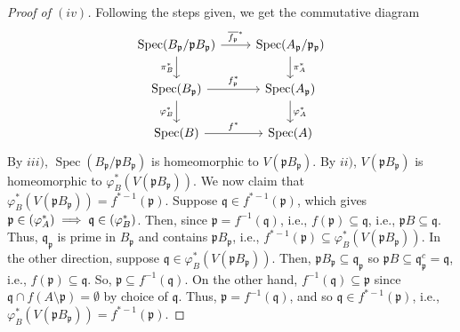 \documentclass[12pt,letterpaper]{article}
\theoremstyle{definition}
\theoremstyle{remark}
\numberwithin{equation}{section}
\numberwithin{figure}{problem}
\let\Im\relax
\DeclareMathOperator{\Im}{im}
\DeclareMathOperator{\Spec}{Spec}
\begin{document}
\begin{proof}[Proof of $(iv)$]
  Following the steps given, we get the commutative diagram
  \begin{equation*}
    \begin{tikzcd}
      \Spec(B_\mathfrak{p}/\mathfrak{p}B_\mathfrak{p}) \arrow{r}{\overline{f_\mathfrak{p}}^*}\arrow{d}[swap]{\pi_B^*} & \Spec(A_\mathfrak{p}/\mathfrak{p}_\mathfrak{p})\arrow{d}{\pi_A^*}\\
      \Spec(B_\mathfrak{p}) \arrow{r}{f_\mathfrak{p}^*}\arrow{d}[swap]{\varphi_B^*} & \Spec(A_\mathfrak{p}) \arrow{d}{\varphi_A^*}\\
      \Spec(B) \arrow{r}{f^*} & \Spec(A)
    \end{tikzcd}
  \end{equation*}
  By $iii)$, $\Spec(B_\mathfrak{p}/\mathfrak{p}B_\mathfrak{p})$ is homeomorphic to $V(\mathfrak{p}B_\mathfrak{p})$. By $ii)$, $V(\mathfrak{p}B_\mathfrak{p})$ is homeomorphic to $\varphi_B^*(V(\mathfrak{p}B_\mathfrak{p}))$. We now claim that $\varphi_B^*(V(\mathfrak{p}B_\mathfrak{p})) = f^{*-1}(\mathfrak{p})$. Suppose $\mathfrak{q} \in f^{*-1}(\mathfrak{p})$, which gives $\mathfrak{p} \in \Im(\varphi_A^*) \implies \mathfrak{q} \in \Im(\varphi_B^*)$. Then, since $\mathfrak{p} = f^{-1}(\mathfrak{q})$, i.e., $f(\mathfrak{p}) \subseteq \mathfrak{q}$, i.e., $\mathfrak{p}B \subseteq \mathfrak{q}$. Thus, $\mathfrak{q}_\mathfrak{p}$ is prime in $B_\mathfrak{p}$ and contains $\mathfrak{p}B_\mathfrak{p}$, i.e., $f^{*-1}(\mathfrak{p}) \subseteq \varphi_B^*(V(\mathfrak{p}B_\mathfrak{p}))$. In the other direction, suppose $\mathfrak{q} \in \varphi_B^*(V(\mathfrak{p}B_\mathfrak{p}))$. Then, $\mathfrak{p}B_\mathfrak{p} \subseteq \mathfrak{q}_\mathfrak{p}$ so $\mathfrak{p}B \subseteq \mathfrak{q}_\mathfrak{p}^c = \mathfrak{q}$, i.e., $f(\mathfrak{p}) \subseteq \mathfrak{q}$. So, $\mathfrak{p} \subseteq f^{-1}(\mathfrak{q})$. On the other hand, $f^{-1}(\mathfrak{q}) \subseteq \mathfrak{p}$ since $\mathfrak{q} \cap f(A \setminus \mathfrak{p}) = \emptyset$ by choice of $\mathfrak{q}$. Thus, $\mathfrak{p} = f^{-1}(\mathfrak{q})$, and so $\mathfrak{q} \in f^{*-1}(\mathfrak{p})$, i.e., $\varphi_B^*(V(\mathfrak{p}B_\mathfrak{p})) = f^{*-1}(\mathfrak{p})$.

\end{proof}
\end{document}
